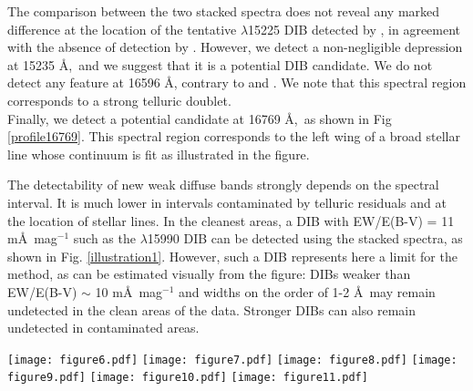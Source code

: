 \documentclass[printer]{aa} %
\begin{document}
The comparison between the two stacked spectra does not reveal any marked difference at the location of the tentative $\lambda$15225 DIB detected by \cite{Geballe11}, in agreement with the absence of detection by \cite{Cox14}. However, we detect a non-negligible depression at 15235 \AA,\ and we suggest that it is a potential DIB candidate. We do not detect any feature at 16596 \AA, contrary to \cite{Geballe11} and \cite{Cox14}. We note that this spectral region corresponds to a strong telluric doublet. \\
Finally, we detect a potential candidate at 16769 \AA,\ as shown in Fig \ref{profile16769}. This spectral region corresponds to the left wing of a broad stellar line whose continuum is fit as illustrated in the figure. 

The detectability of new weak diffuse bands strongly depends on the spectral interval. It is much lower in intervals contaminated by telluric residuals and at the location of stellar lines. In the cleanest areas, a DIB with EW/E(B-V) = 11 m\AA\ mag$^{-1}$ such as the $\lambda$15990 DIB can be detected using the stacked spectra, as shown in Fig. \ref{illustration1}. However, such a DIB represents here a limit for the method, as can be estimated visually from the figure: DIBs weaker than EW/E(B-V) $\sim$ 10 m\AA\ mag$^{-1}$ and widths on the order of 1-2 \AA\ may remain undetected  in the clean areas of the data. Stronger DIBs can also remain undetected in contaminated areas.

\begin{figure*}[!htb]
\centering
 \texttt{[image: figure6.pdf]}
\texttt{[image: figure7.pdf]}
 \texttt{[image: figure8.pdf]}
  \texttt{[image: figure9.pdf]}
 \texttt{[image: figure10.pdf]}
 \texttt{[image: figure11.pdf]}
\caption{\label{illustration1} Stacked spectra created from 164 sight lines selected for their strong, well detected $\lambda$15273 DIB (solid black curve), and for 40 sightlines selected for a combination of high signal, clean spectrum, and weakness of the $\lambda$15273 DIB (blue solid curve). Before stacking, the spectra have been shifted to a common rest frame. In each figure the pink dashed lines show the telluric models and the green dashed curve displays the NIR emission sky. At the location of an actual DIB we expect the black curve to exhibit a depression by comparison with the blue curve. Telluric absorption and emission spectra allow us to distinguish artifacts that are due to telluric lines and real interstellar absorptions. Weak NIR DIBs detected previously are indicated by colored boxes with the following code: green box: detected by \cite{Geballe11} and confirmed by \cite{Cox14}; yellow box: detected by \cite{Geballe11} , but not confirmed by \cite{Cox14}; red box: potential new detection.}
\end{figure*}
\end{document}
